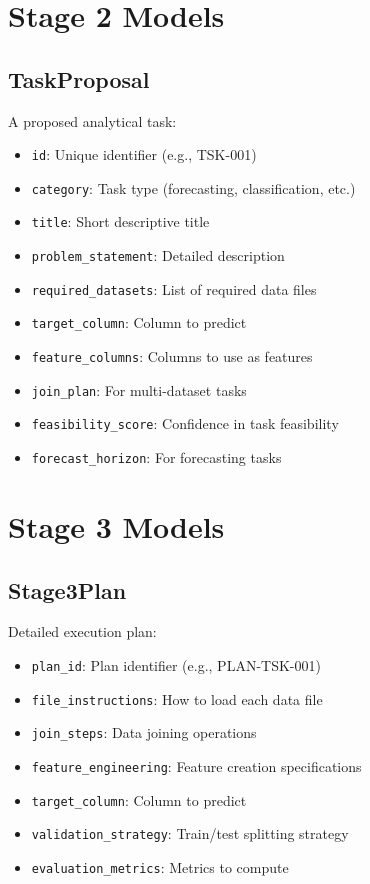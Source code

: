 \documentclass[12pt,a4paper]{report}
\begin{document}
\section{Stage 2 Models}
\subsection{TaskProposal}
A proposed analytical task:
\begin{itemize}
    \item \texttt{id}: Unique identifier (e.g., TSK-001)
    \item \texttt{category}: Task type (forecasting, classification, etc.)
    \item \texttt{title}: Short descriptive title
    \item \texttt{problem\_statement}: Detailed description
    \item \texttt{required\_datasets}: List of required data files
    \item \texttt{target\_column}: Column to predict
    \item \texttt{feature\_columns}: Columns to use as features
    \item \texttt{join\_plan}: For multi-dataset tasks
    \item \texttt{feasibility\_score}: Confidence in task feasibility
    \item \texttt{forecast\_horizon}: For forecasting tasks
\end{itemize}

\section{Stage 3 Models}
\subsection{Stage3Plan}
Detailed execution plan:
\begin{itemize}
    \item \texttt{plan\_id}: Plan identifier (e.g., PLAN-TSK-001)
    \item \texttt{file\_instructions}: How to load each data file
    \item \texttt{join\_steps}: Data joining operations
    \item \texttt{feature\_engineering}: Feature creation specifications
    \item \texttt{target\_column}: Column to predict
    \item \texttt{validation\_strategy}: Train/test splitting strategy
    \item \texttt{evaluation\_metrics}: Metrics to compute
\end{itemize}
\end{document}
